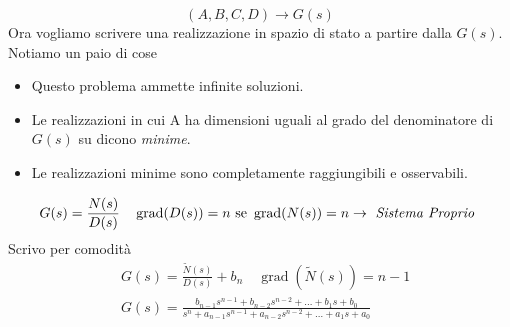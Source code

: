 	\[\left(A,B,C,D\right)\to G(s)\]
	Ora vogliamo scrivere una realizzazione in spazio di stato a partire dalla $ G(s) $. Notiamo un paio di cose
	\begin{itemize}
		\item Questo problema ammette infinite soluzioni.
		\item Le realizzazioni in cui A ha dimensioni uguali al grado del denominatore di $ G(s) $ su dicono \emph{minime}.
		\item Le realizzazioni minime sono completamente raggiungibili e osservabili.
	\end{itemize}
	\[G(s) = \frac{N(s)}{D(s)}\quad \operatorname{grad}(D(s)) = n  \text{ se } \operatorname{grad}(N(s))= n \to \text{ \emph{Sistema Proprio} }\]
	Scrivo per comodità
	\[\begin{aligned}
		& G(s)=\frac{\tilde{N}(s)}{D(s)}+b_n \quad \operatorname{grad}(\tilde{N}(s))=n-1 \\
		& G(s)=\frac{b_{n-1} s^{n-1}+b_{n-2} s^{n-2}+\ldots+b_1 s+b_0}{s^n+a_{n-1} s^{n-1}+a_{n-2} s^{n-2}+\ldots+a_1 s+a_0}
	\end{aligned}\]
